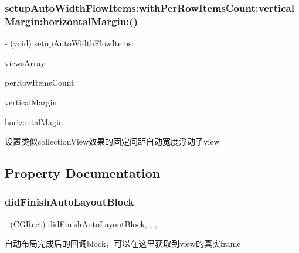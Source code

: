 \subsubsection{\texorpdfstring{setup\+Auto\+Width\+Flow\+Items\+:with\+Per\+Row\+Items\+Count\+:vertical\+Margin\+:horizontal\+Margin\+:()}{setupAutoWidthFlowItems:withPerRowItemsCount:verticalMargin:horizontalMargin:()}\hspace{0.1cm}{\footnotesize\ttfamily [3/3]}}
{\footnotesize\ttfamily -\/ (void) setup\+Auto\+Width\+Flow\+Items\+: \begin{DoxyParamCaption}\item[{(N\+S\+Array $\ast$)}]{views\+Array }\item[{withPerRowItemsCount:(N\+S\+Integer)}]{per\+Row\+Items\+Count }\item[{verticalMargin:(C\+G\+Float)}]{vertical\+Margin }\item[{horizontalMargin:(C\+G\+Float)}]{horizontal\+Magin }\end{DoxyParamCaption}}

设置类似collection\+View效果的固定间距自动宽度浮动子view 

\subsection{Property Documentation}
\mbox{\label{category_u_i_view_07_s_d_layout_extention_08_a957b4b4a9f1e64ff40d9e055913b8421}} 
\subsubsection{\texorpdfstring{did\+Finish\+Auto\+Layout\+Block}{didFinishAutoLayoutBlock}}
{\footnotesize\ttfamily -\/ (C\+G\+Rect) did\+Finish\+Auto\+Layout\+Block\hspace{0.3cm}{\ttfamily [read]}, {\ttfamily [write]}, {\ttfamily [nonatomic]}, {\ttfamily [assign]}}

自动布局完成后的回调block，可以在这里获取到view的真实frame \mbox{\label{category_u_i_view_07_s_d_layout_extention_08_ac753f3f534c613107cf0c321c59f4f77}} 
